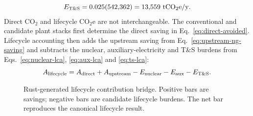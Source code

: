 \begin{equation}\label{eq:ts-lca}
E_{\rm T\&S}=0.025(542{,}362)=13{,}559~\mathrm{tCO_2e/y}.
\end{equation}
Direct CO$_2$ and lifecycle CO$_2$e are not interchangeable. The conventional and candidate plant stacks first determine the direct saving in Eq.~\ref{eq:direct-avoided}. Lifecycle accounting then adds the upstream saving from Eq.~\ref{eq:upstream-ng-saving} and subtracts the nuclear, auxiliary-electricity and T\&S burdens from Eqs.~\ref{eq:nuclear-lca}, \ref{eq:aux-lca} and \ref{eq:ts-lca}:
\begin{equation}\label{eq:lifecycle-avoided}
A_{\rm lifecycle}=A_{\rm direct}+A_{\rm upstream}-E_{\rm nuclear}-E_{\rm aux}-E_{\rm T\&S}.
\end{equation}

\LifecycleFlowFigure

\begin{table}[htbp]\centering\scriptsize
\caption{Canonical lifecycle-emissions ledger generated by Rust. SAVED means less than the conventional baseline; ADDED means a new candidate burden.}
\label{tab:co2-ledger}
\end{table}

\begin{figure}[htbp]\centering

\caption{Rust-generated lifecycle contribution bridge.  Positive bars are savings; negative bars are candidate lifecycle burdens.  The net bar reproduces the canonical lifecycle result.}
\label{fig:co2-bridge}
\end{figure}

